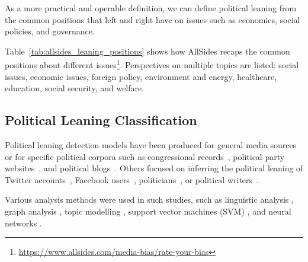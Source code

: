 As a more practical and operable definition, we can define political leaning from the common positions that left and right have on issues such as economics, social policies, and governance.

Table~\ref{tab:allsides_leaning_positions} shows how AllSides recaps the common positions about different issues\footnote{\url{https://www.allsides.com/media-bias/rate-your-bias}}.
Perspectives on multiple topics are listed: social issues, economic issues, foreign policy, environment and energy, healthcare, education, social security, and welfare.




\subsection{\statusgreen Political Leaning Classification}
\label{ssec:lit_leaning_classification}




Political leaning detection models have been produced for general media sources~\citep{budak} or for 
specific political corpora such as congressional records~\citep{gentzkow}, political party websites~\citep{yan2017perils}, and political blogs~\citep{ahmed201}.  
Others focused on inferring the political leaning of Twitter accounts~\citep{Cohen2013ClassifyingPO}, Facebook users~\citep{Bakshy1130}, politicians~\citep{thomas-etal-2006-get}, or political writers~\citep{iyyer-etal-2014-political}. 

Various analysis methods were used in such studies, such as linguistic analysis \citep{gentzkow}, graph analysis \citep{chen2017opinion}, topic modelling \citep{ahmed201, Cohen2013ClassifyingPO}, support vector machines (SVM) \citep{Bakshy1130,thomas-etal-2006-get}, and neural networks \citep{iyyer-etal-2014-political,baly2020we}.




